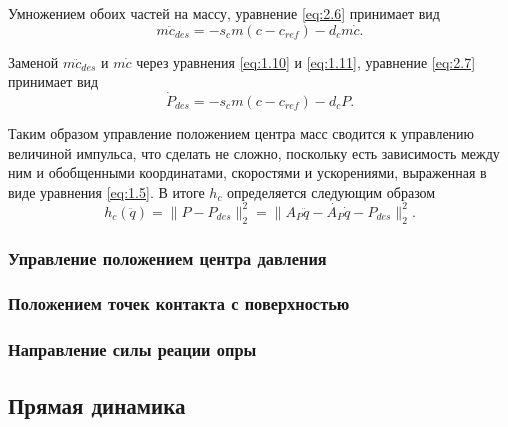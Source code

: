 Умножением обоих частей на массу, уравнение \ref{eq:2.6} принимает вид
\begin{equation*}
  m \ddot{c}_{des} = - s_{c} m (c - c_{ref}) - d_{c} m \dot{c}. \tag{2.7}\label{eq:2.7}
\end{equation*}

Заменой $m \ddot{c}_{des}$ и $m \dot{c}$ через уравнения \ref{eq:1.10} и \ref{eq:1.11}, уравнение \ref{eq:2.7} принимает вид
\begin{equation*}
  \dot{P}_{des} = - s_{c} m (c - c_{ref}) - d_{c} P. \tag{2.8}\label{eq:2.8}
\end{equation*}

Таким образом управление положением центра масс сводится к управлению величиной импульса, что сделать не сложно, поскольку есть зависимость между ним и обобщенными координатами, скоростями и ускорениями, выраженная в виде уравнения \ref{eq:1.5}. В итоге $h_{c}$ определяется следующим образом
\begin{equation*}
  h_{c}(\ddot{q}) = \lVert P - P_{des} \rVert_{2}^{2} = \lVert A_{P}\ddot{q} - \dot{A_{P}} \dot{q} - P_{des} \rVert_{2}^{2}.
\end{equation*}

\subsubsection{Управление положением центра давления}


\subsubsection{Положением точек контакта с поверхностью}


\subsubsection{Направление силы реации опры}

\subsection{Прямая динамика}


